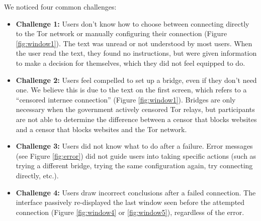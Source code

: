 \documentclass{template}
\begin{document}
We noticed four common challenges:  

\begin{itemize} \itemsep1pt \parskip0pt 
\item {\bfseries Challenge 1:} Users don't know how to choose between connecting directly to the Tor network or manually configuring their connection (Figure \ref{fig:window1}). The text was unread or not understood by most users. When the user read the text, they found no instructions, but were given information to make a decision for themselves, which they did not feel equipped to do.  
\item {\bfseries Challenge 2:} Users feel compelled to set up a bridge, even if they don't need one. We believe this is due to the text on the first screen, which refers to a ``censored internee connection'' (Figure \ref{fig:window1}). Bridges are only necessary when the government actively censored Tor relays, but participants are not able to determine the difference between a censor that blocks websites and a censor that blocks websites and the Tor network. 
\item {\bfseries Challenge 3:} Users did not know what to do after a failure. Error messages (see Figure \ref{fig:error}) did not guide users into taking specific actions (such as trying a different bridge, trying the same configuration again, try connecting directly, etc.).
\item {\bfseries Challenge 4:} Users draw incorrect conclusions after a failed connection. The interface passively re-displayed the last window seen before the attempted connection (Figure \ref{fig:window4} or \ref{fig:window5}), regardless of the error.
\end{itemize}
\end{document}
